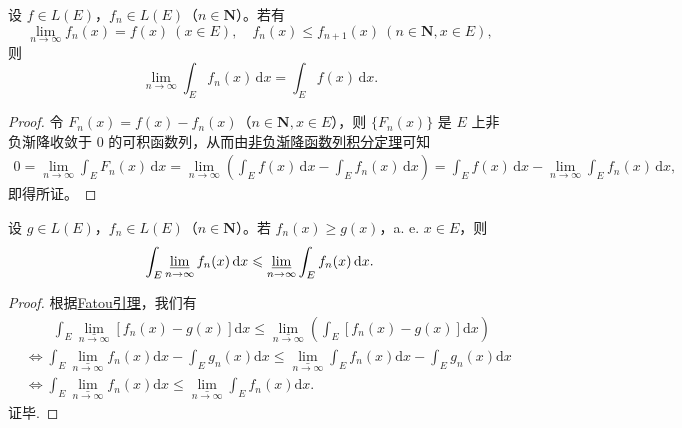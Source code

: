 \documentclass[../../main.tex]{subfiles}
\begin{document}
\begin{theorem}\label{theorem:递增可测函数列的积分和极限可交换}
设 $f \in L(E)$，$f_n \in L(E)$（$n \in \mathbf{N}$）。若有
\[
\lim_{n \to \infty} f_n(x) = f(x) \ (x \in E), \quad f_n(x) \leqslant f_{n + 1}(x) \ (n \in \mathbf{N}, x \in E),
\]
则
\[
\lim_{n \to \infty} \int_E f_n(x) \, \mathrm{d}x = \int_E f(x) \, \mathrm{d}x.
\]
\end{theorem}
\begin{proof} 
令 $F_n(x) = f(x) - f_n(x)$（$n \in \mathbf{N}, x \in E$），则 $\{ F_n(x) \}$ 是 $E$ 上非负渐降收敛于 $0$ 的可积函数列，从而由\hyperref[corollary:非负渐降函数列积分定理]{非负渐降函数列积分定理}可知
\begin{align*}
0 = \lim_{n \to \infty} \int_E F_n(x) \, \mathrm{d}x 
= \lim_{n \to \infty} \left( \int_E f(x) \, \mathrm{d}x - \int_E f_n(x) \, \mathrm{d}x \right) 
= \int_E f(x) \, \mathrm{d}x - \lim_{n \to \infty} \int_E f_n(x) \, \mathrm{d}x,
\end{align*}
即得所证。
\end{proof}

\begin{proposition}
设 $g \in L(E)$，$f_n \in L(E)$（$n \in \mathbf{N}$）。若 $f_n(x) \geqslant g(x)$，a. e. $x \in E$，则
\[
\int_E \varliminf_{n \to \infty} f_n(x) \, \mathrm{d}x \leqslant \varliminf_{n \to \infty} \int_E f_n(x) \, \mathrm{d}x.
\]
\end{proposition}
\begin{proof}
根据\hyperref[lemma:Fatou引理]{Fatou引理}，我们有
\begin{align*}
&\quad \quad \int_E{\underset{n\rightarrow \infty}{\underline{\lim }}\left[ f_n\left( x \right) -g\left( x \right) \right] \mathrm{d}x}\leqslant \underset{n\rightarrow \infty}{\underline{\lim }}\left( \int_E{\left[ f_n\left( x \right) -g\left( x \right) \right] \mathrm{d}x} \right) 
\\
&\Longleftrightarrow \int_E{\underset{n\rightarrow \infty}{\underline{\lim }}f_n\left( x \right) \mathrm{d}x}-\int_E{g_n\left( x \right) \mathrm{d}x}\leqslant \underset{n\rightarrow \infty}{\underline{\lim }}\int_E{f_n\left( x \right) \mathrm{d}x}-\int_E{g_n\left( x \right) \mathrm{d}x}
\\
&\Longleftrightarrow \int_E{\underset{n\rightarrow \infty}{\underline{\lim }}f_n\left( x \right) \mathrm{d}x}\leqslant \underset{n\rightarrow \infty}{\underline{\lim }}\int_E{f_n\left( x \right) \mathrm{d}x}.
\end{align*}
证毕.
\end{proof}
\end{document}
